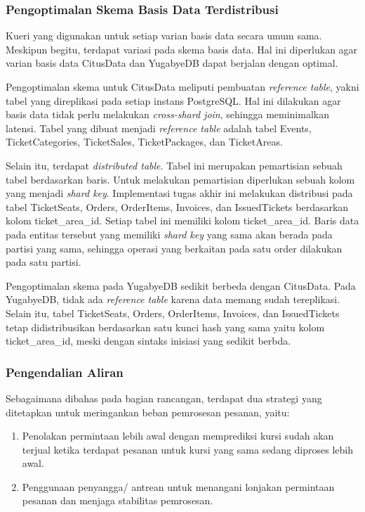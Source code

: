 \subsubsection{Pengoptimalan Skema Basis Data Terdistribusi}

Kueri yang digunakan untuk setiap varian basis data secara umum sama. Meskipun begitu, terdapat variasi pada skema basis data. Hal ini diperlukan agar varian basis data CitusData dan YugabyeDB dapat berjalan dengan optimal.

Pengoptimalan skema untuk CitusData meliputi pembuatan \textit{reference table}, yakni tabel yang direplikasi pada setiap instans PostgreSQL. Hal ini dilakukan agar basis data tidak perlu melakukan \textit{cross-shard join}, sehingga meminimalkan latensi. Tabel yang dibuat menjadi \textit{reference table} adalah tabel Events, TicketCategories, TicketSales, TicketPackages, dan TicketAreas.

Selain itu, terdapat \textit{distributed table}. Tabel ini merupakan pemartisian sebuah tabel berdasarkan baris. Untuk melakukan pemartisian diperlukan sebuah kolom yang menjadi \textit{shard key}. Implementasi tugas akhir ini melakukan distribusi pada tabel TicketSeats, Orders, OrderItems, Invoices, dan IssuedTickets berdasarkan kolom ticket\_area\_id. Setiap tabel ini memiliki kolom ticket\_area\_id. Baris data pada entitas tersebut yang memiliki \textit{shard key} yang sama akan berada pada partisi yang sama, sehingga operasi yang berkaitan pada satu order dilakukan pada satu partisi.

Pengoptimalan skema pada YugabyeDB sedikit berbeda dengan CitusData. Pada YugabyeDB, tidak ada \textit{reference table} karena data memang sudah tereplikasi. Selain itu, tabel TicketSeats, Orders, OrderItems, Invoices, dan IssuedTickets tetap didistribusikan berdasarkan satu kunci hash yang sama yaitu kolom ticket\_area\_id, meski dengan sintaks inisiasi yang sedikit berbda.

\subsubsection{Pengendalian Aliran}

Sebagaimana dibahas pada bagian rancangan, terdapat dua strategi yang ditetapkan untuk meringankan beban pemrosesan pesanan, yaitu:

\begin{enumerate}
      \item Penolakan permintaan lebih awal dengan memprediksi kursi sudah akan terjual ketika terdapat pesanan untuk kursi yang sama sedang diproses lebih awal.
      \item Penggunaan penyangga/ antrean untuk menangani lonjakan permintaan pesanan dan menjaga stabilitas pemrosesan.
\end{enumerate}

